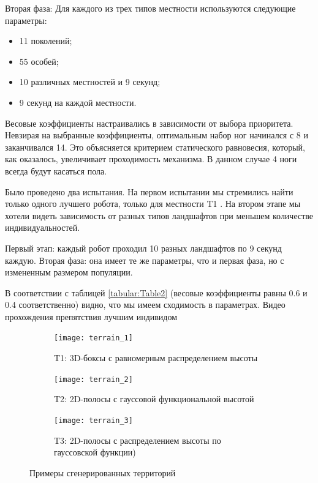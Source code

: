 Вторая фаза: Для каждого из трех типов местности используются следующие параметры:
\begin{itemize}
\item 11 поколений;
\item 55 особей;
\item 10 различных местностей и 9 секунд;
\item 9 секунд на каждой местности.
\end{itemize}

Весовые коэффициенты настраивались в зависимости от выбора приоритета. Невзирая на выбранные коэффициенты, оптимальным набор ног начинался с 8 и заканчивался 14. Это объясняется критерием статического равновесия, который, как оказалось, увеличивает проходимость механизма. В данном случае 4 ноги всегда будут касаться пола. 

Было проведено два испытания. На первом испытании мы стремились найти только одного лучшего робота, только для местности T1 . На втором этапе мы хотели видеть зависимость от разных типов ландшафтов при меньшем количестве индивидуальностей.

Первый этап: каждый робот проходил 10 разных ландшафтов по 9 секунд каждую. Вторая фаза: она имеет те же параметры, что и первая фаза, но с измененным размером популяции. 

В соответствии с таблицей \ref{tabular:Table2} (весовые коэффициенты равны 0.6 и 0.4 соответственно) видно, что мы имеем сходимость в параметрах. Видео прохождения препятствия лучшим индивидом \quad
{}

\begin{figure}[h]
    \begin{subfigure}{0.33\textwidth}
    \centering\texttt{[image: terrain\_1]} 
    \caption{T1: 3D-боксы с равномерным распределением высоты}
    \label{fig:terrain_1}
    \end{subfigure}
    \begin{subfigure}{0.33\textwidth}
    \centering\texttt{[image: terrain\_2]} 
    \caption{T2: 2D-полосы с гауссовой функциональной высотой}
    \label{fig:terrain_2}
    \end{subfigure}
    \begin{subfigure}{0.33\textwidth}
    \centering\texttt{[image: terrain\_3]}
    \caption{T3: 2D-полосы с распределением высоты по гауссовской функции)}
    \label{fig:terrain_3}
    \end{subfigure}
     
    \caption{Примеры сгенерированных территорий}
    \label{fig:terrains}
\end{figure}
\vspace{-0.5cm}

